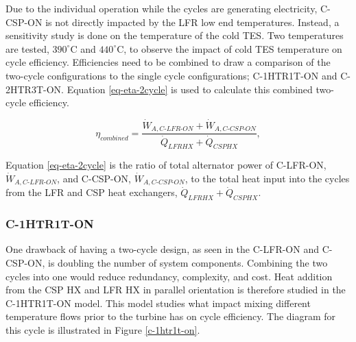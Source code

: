 \begin{paracol}{2}
\linenumbers
\switchcolumn

 Due to the individual operation while the cycles are generating electricity, C-CSP-ON is not directly impacted by the LFR low end temperatures. Instead, a sensitivity study is done on the temperature of the cold TES. Two temperatures are tested, $390^{\circ}$C and $440^{\circ}$C, to observe the impact of cold TES temperature on cycle efficiency. Efficiencies need to be combined to draw a comparison of the two-cycle configurations to the single cycle configurations; C-1HTR1T-ON and C-2HTR3T-ON. Equation \ref{eq-eta-2cycle} is used to calculate this combined two-cycle efficiency.

 \begin{equation}
    \label{eq-eta-2cycle}
    \eta_{combined} = \frac{\dot{W}_{A,C\text{-}LFR\text{-}ON}+\dot{W}_{A,C\text{-}CSP\text{-}ON}}{\dot{Q}_{LFRHX}+\dot{Q}_{CSPHX}},
\end{equation}

Equation \ref{eq-eta-2cycle} is the ratio of total alternator power of C-LFR-ON, $\dot{W}_{A,C\text{-}LFR\text{-}ON}$, and C-CSP-ON, $\dot{W}_{A,C\text{-}CSP\text{-}ON}$, to the total heat input into the cycles from the LFR and CSP heat exchangers, $\dot{Q}_{LFRHX}+\dot{Q}_{CSPHX}$.




\subsubsection{C-1HTR1T-ON} 

One drawback of having a two-cycle design, as seen in the C-LFR-ON and C-CSP-ON, is doubling the number of system components. Combining the two cycles into one would reduce redundancy, complexity, and cost. Heat addition from the CSP HX and LFR HX in parallel orientation is therefore studied in the C-1HTR1T-ON model. This model studies what impact mixing different temperature flows prior to the turbine has on cycle efficiency. The diagram for this cycle is illustrated in Figure \ref{c-1htr1t-on}.

\end{paracol}

